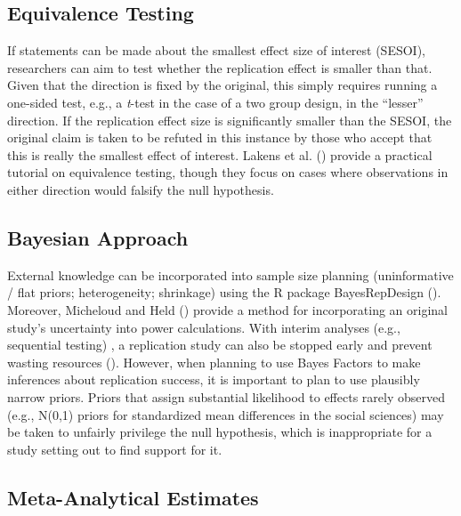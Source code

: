 \documentclass[
  letterpaper,
  DIV=11,
  openany,
  fontsize=12pt,
  parskip=half,
  headings=big,
  numbers=noenddot,
  titlepage=false]{scrreprt}
\begin{document}
\subsection{Equivalence Testing}\label{equivalence-testing}

If statements can be made about the smallest effect size of interest
(SESOI), researchers can aim to test whether the replication effect is
smaller than that. Given that the direction is fixed by the original,
this simply requires running a one-sided test, e.g., a \emph{t}-test in
the case of a two group design, in the ``lesser'' direction. If the
replication effect size is significantly smaller than the SESOI, the
original claim is taken to be refuted in this instance by those who
accept that this is really the smallest effect of interest. Lakens et
al. () provide a practical tutorial
on equivalence testing, though they focus on cases where observations in
either direction would falsify the null hypothesis.

\subsection{Bayesian Approach}\label{bayesian-approach}

External knowledge can be incorporated into sample size planning
(uninformative / flat priors; heterogeneity; shrinkage) using the R
package BayesRepDesign (). Moreover, Micheloud and Held
() provide a method for
incorporating an original study's uncertainty into power calculations.
With interim analyses (e.g., sequential testing) , a replication study
can also be stopped early and prevent wasting resources
(). However, when planning to use Bayes Factors to
make inferences about replication success, it is important to plan to
use plausibly narrow priors. Priors that assign substantial likelihood
to effects rarely observed (e.g., N(0,1) priors for standardized mean
differences in the social sciences) may be taken to unfairly privilege
the null hypothesis, which is inappropriate for a study setting out to
find support for it.

\subsection{Meta-Analytical Estimates}\label{meta-analytical-estimates}
\end{document}
